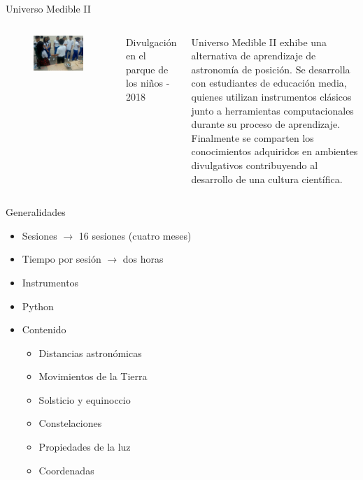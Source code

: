 \documentclass{beamer}
\begin{document}

\begin{frame}{Universo Medible II}
 \begin{columns}
  \begin{figure}
   \centering
   \includegraphics[scale=0.2]{Imagenes/UM_02}
  \end{figure}
  \begin{center}
  \Tiny
  Divulgación en el parque de los niños - 2018
  \end{center}
 \small
 \justify
  Universo Medible II exhibe una alternativa de aprendizaje de astronomía de posición. Se desarrolla con estudiantes de educación media, quienes utilizan instrumentos clásicos junto a herramientas computacionales  durante su proceso de aprendizaje. Finalmente se comparten los conocimientos adquiridos en ambientes divulgativos contribuyendo al desarrollo de una cultura científica.
 \end{columns}
\end{frame}


\begin{frame}{Generalidades}
\begin{itemize}
\item Sesiones $\rightarrow$ 16 sesiones (cuatro meses)
\item Tiempo por sesión $\rightarrow$ dos horas
\item Instrumentos
\item Python 
\item Contenido
 \begin{itemize}
  \item Distancias astronómicas
  \item Movimientos de la Tierra
  \item Solsticio y equinoccio
  \item Constelaciones
  \item Propiedades de la luz
  \item Coordenadas 
 \end{itemize}
\end{itemize}
\end{frame}
\end{document}

